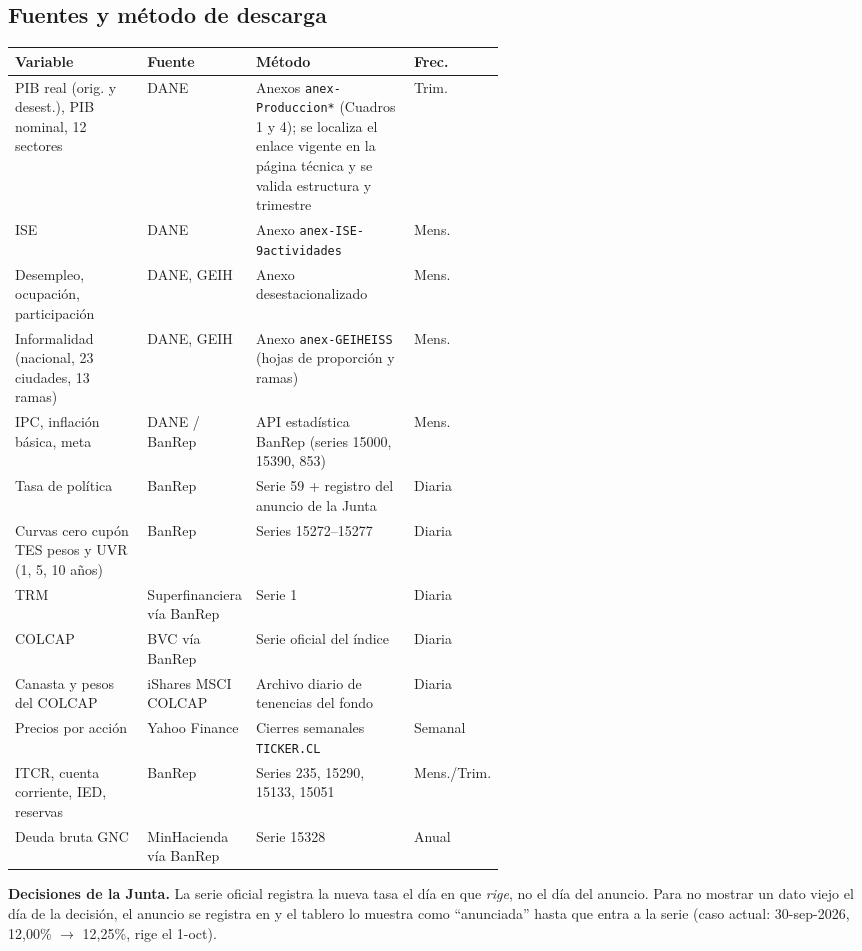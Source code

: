 \documentclass[11pt]{article}
\begin{document}
\subsection{Fuentes y método de descarga}
\begin{center}\small
\begin{tabularx}{\linewidth}{@{}p{0.27\linewidth}p{0.2\linewidth}Xp{0.1\linewidth}@{}}
\toprule
\textbf{Variable} & \textbf{Fuente} & \textbf{Método} & \textbf{Frec.}\\\midrule
PIB real (orig. y desest.), PIB nominal, 12 sectores & DANE & Anexos \texttt{anex-Produccion*} (Cuadros 1 y 4); se localiza el enlace vigente en la página técnica y se valida estructura y trimestre & Trim.\\
ISE & DANE & Anexo \texttt{anex-ISE-9actividades} & Mens.\\
Desempleo, ocupación, participación & DANE, GEIH & Anexo desestacionalizado & Mens.\\
Informalidad (nacional, 23 ciudades, 13 ramas) & DANE, GEIH & Anexo \texttt{anex-GEIHEISS} (hojas de proporción y ramas) & Mens.\\
IPC, inflación básica, meta & DANE / BanRep & API estadística BanRep (series 15000, 15390, 853) & Mens.\\
Tasa de política & BanRep & Serie 59 + registro del anuncio de la Junta & Diaria\\
Curvas cero cupón TES pesos y UVR (1, 5, 10 años) & BanRep & Series 15272–15277 & Diaria\\
TRM & Superfinanciera vía BanRep & Serie 1 & Diaria\\
COLCAP & BVC vía BanRep & Serie oficial del índice & Diaria\\
Canasta y pesos del COLCAP & iShares MSCI COLCAP & Archivo diario de tenencias del fondo & Diaria\\
Precios por acción & Yahoo Finance & Cierres semanales \texttt{TICKER.CL} & Semanal\\
ITCR, cuenta corriente, IED, reservas & BanRep & Series 235, 15290, 15133, 15051 & Mens./Trim.\\
Deuda bruta GNC & MinHacienda vía BanRep & Serie 15328 & Anual\\
\bottomrule
\end{tabularx}
\end{center}

\textbf{Decisiones de la Junta.} La serie oficial registra la nueva tasa el día en que \emph{rige}, no el día del
anuncio. Para no mostrar un dato viejo el día de la decisión, el anuncio se registra en
 y el tablero lo muestra como “anunciada” hasta que entra a la serie
(caso actual: 30-sep-2026, 12,00\% $\rightarrow$ 12,25\%, rige el 1-oct).
\end{document}
